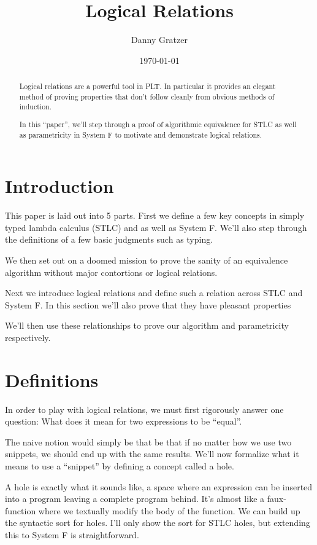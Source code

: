 \documentclass[12pt]{article}
\begin{document}
\title{Logical Relations}
\author{Danny Gratzer}
\date{\today}
\maketitle

\begin{abstract}
Logical relations are a powerful tool in PLT. In particular it
provides an elegant method of proving properties that don't follow
cleanly from obvious methods of induction.

In this ``paper'', we'll step through a proof of algorithmic
equivalence for STLC as well as parametricity in System F to motivate
and demonstrate logical relations.
\end{abstract}

\section{Introduction}
This paper is laid out into 5 parts. First we define a few key
concepts in simply typed lambda calculus (STLC) and as well as System
F. We'll also step through the definitions of a few basic judgments
such as typing.

We then set out on a doomed mission to prove the sanity of an
equivalence algorithm without major contortions or logical
relations.

Next we introduce logical relations and define such a relation across
STLC and System F. In this section we'll also prove that they have
pleasant properties

We'll then use these relationships to prove our algorithm and
parametricity respectively.

\section{Definitions}
In order to play with logical relations, we must first rigorously
answer one question: What does it mean for two expressions to be
``equal''.

The naive notion would simply be that be that if no matter how we use
two snippets, we should end up with the same results. We'll now
formalize what it means to use a ``snippet'' by defining a concept
called a hole.

A hole is exactly what it sounds like, a space where an expression can
be inserted into a program leaving a complete program behind. It's
almost like a faux-function where we textually modify the body of the
function. We can build up the syntactic sort for holes. I'll only show
the sort for STLC holes, but extending this to System F is straightforward.
\end{document}
